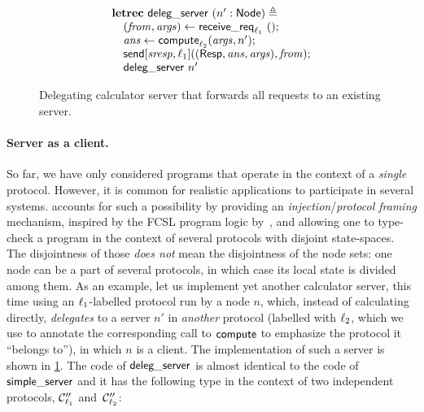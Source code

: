 \begin{figure}
\[
\begin{array}{ll}
\letrecz~\dserver~(n' : \mathsf{Node}) \triangleq \\
\spa (\From, \args) \asgn \blockr_{\lab_1}~();  \\
\spa \ans \asgn \cclient_{\lab_2}(\args, n'); \\
\spa \acts[\trans{sresp},\lab_1]((\tresp, \ans, \args), \From);  \\
\spa \dserver~n'  \\
\end{array}
\]
\caption{Delegating calculator server that forwards all requests to an existing server.}
\label{fig:deleg}
\end{figure}
%
\paragraph{Server as a client.}

So far, we have only considered programs that operate in the context
of a \emph{single} protocol. However, it is common for realistic
applications to participate in several systems.  \disel accounts for
such a possibility by providing an \emph{injection}/\emph{protocol
  framing} mechanism, inspired by the FCSL program
logic by~\citet{Nanevski-al:ESOP14}, and allowing one to type-check a
program in the context of several protocols with disjoint
state-spaces.
%
The disjointness of those \emph{does not} mean the
disjointness of the node sets: one node can be a part of several
protocols, in which case its local state is divided among them.
%
As an example, let us implement yet another calculator server, this
time using an $\ell_1$-labelled protocol run by a node $n$, which,
instead of calculating directly, \emph{delegates} to a server $n'$ in
\emph{another} protocol (labelled with $\ell_2$, which we use to
annotate the corresponding call to $\mathsf{compute}$ to emphasize the
protocol it ``belongs to''), in which $n$ is a client.
%
The \disel implementation of such a server is shown in \cref{fig:deleg}.
%
The code of $\mathsf{deleg\_server}$ is almost identical to the code of $\mathsf{simple\_server}$
and it has the following type in the context of two independent
protocols, $\mathcal{C}''_{\ell_1}$ and~$\mathcal{C}''_{\ell_2}$:
%
%

